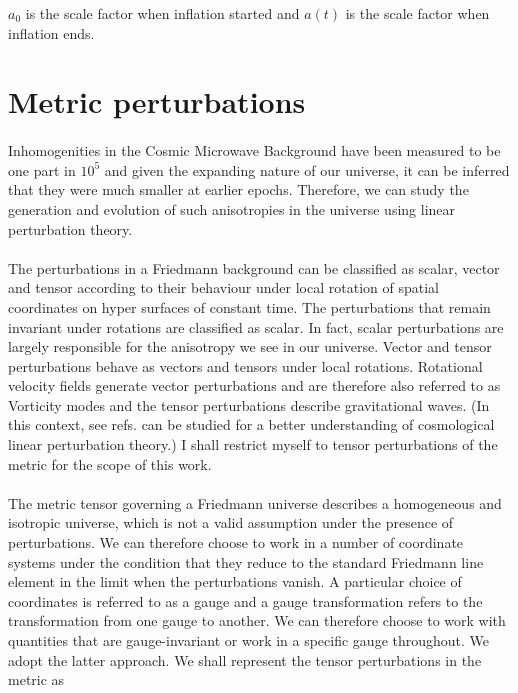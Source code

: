 \documentclass[12pt,a4paper,oneside]{book}
\begin{document}
\noindent $a_0$ is the scale factor when inflation started and $a(t)$ is the scale factor 
when inflation ends.

\section{Metric perturbations}

\paragraph*{} Inhomogenities in the Cosmic Microwave Background 
have been measured to be one part in $10^5$ and given the expanding 
nature of our universe, it can be inferred that they were much smaller 
at earlier epochs. Therefore, we can study the generation and evolution 
of such anisotropies in the universe using linear perturbation theory.

\paragraph*{} The perturbations in a Friedmann background can be 
classified as scalar, vector and tensor according to their behaviour under 
local rotation of spatial coordinates on hyper surfaces of constant time. 
The perturbations that remain invariant under rotations are classified as 
scalar. In fact, scalar perturbations are largely responsible for the anisotropy 
we see in our universe. Vector and tensor perturbations behave as vectors and 
tensors under local rotations. Rotational velocity fields generate vector perturbations 
and are therefore also referred to as Vorticity modes and 
the tensor perturbations describe gravitational waves. (In this context, see refs. 
\cite{Sriramkumar L - 2009, Dodelson, Durrer, Riotto, Kinney, Linde, B1, B2, G1, AG} 
can be studied for a better understanding of cosmological linear perturbation theory.)
I shall restrict myself to tensor perturbations of the metric for the scope of this work.

\paragraph*{} The metric tensor governing a Friedmann universe describes a 
homogeneous and isotropic universe, which is not a valid assumption under the presence 
of perturbations. We can therefore choose to work in a number of coordinate systems 
under the condition that they reduce to the standard Friedmann line element in the limit 
when the perturbations vanish. A particular choice of coordinates is referred to as a gauge 
and a gauge transformation refers to the transformation from one gauge to another. 
We can therefore choose to work with quantities that are gauge-invariant or work in a 
specific gauge throughout. We adopt the latter approach. We shall represent the tensor 
perturbations in the metric as 
\end{document}

